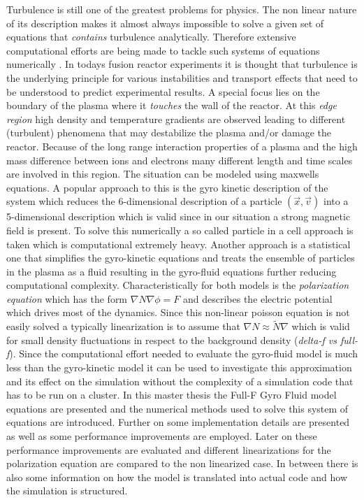 \documentclass[master.tex]{subfiles}
\begin{document}
Turbulence is still one of the greatest problems for physics. The non linear nature of its description makes it almost always impossible to solve a given set of equations that \textit{contains} turbulence analytically. Therefore extensive computational efforts are being made to tackle such systems of equations numerically \cite{IntroTurbulence}.\newline
In todays fusion reactor experiments it is thought that turbulence is the underlying principle for various instabilities and transport effects that need to be understood to predict experimental results. A special focus lies on the boundary of the plasma where it \textit{touches} the wall of the reactor. At this \textit{edge region} high density and temperature gradients are observed leading to different (turbulent) phenomena that may destabilize the plasma and/or damage the reactor.\newline
Because of the long range interaction properties of a plasma and the high mass difference between ions and electrons many different length and time scales are involved in this region.\newline
The situation can be modeled using maxwells equations. A popular approach to this is the gyro kinetic description of the system which reduces the 6-dimensional description of a particle $(\vec{x},\vec{v})$ into a 5-dimensional description which is valid since in our situation a strong magnetic field is present. To solve this numerically a so called particle in a cell approach is taken which is computational extremely heavy.\newline
Another approach is a statistical one that simplifies the gyro-kinetic equations and treats the ensemble of particles in the plasma as a fluid resulting in the gyro-fluid equations further reducing computational complexity. Characteristically for both models is the \textit{polarization equation} which has the form $\nabla N \nabla \phi = F$ and describes the electric potential which drives most of the dynamics. Since this non-linear poisson equation is not easily solved a typically linearization is to assume that $\nabla N \approx \tilde{N} \nabla$ which is valid for small density fluctuations in respect to the background density (\textit{delta-f vs full-f}). Since the computational effort needed to evaluate the gyro-fluid model is much less than the gyro-kinetic model it can be used to investigate this approximation and its effect on the simulation without the complexity of a simulation code that has to be run on a cluster.\newline
In this master thesis the Full-F Gyro Fluid model equations are presented and the numerical methods used to solve this system of equations are introduced. Further on some implementation details are presented as well as some performance improvements are employed. Later on these performance improvements are evaluated and different linearizations for the polarization equation are compared to the non linearized case.\newline
In between there is also some information on how the model is translated into actual code and how the simulation is structured.
\end{document}
